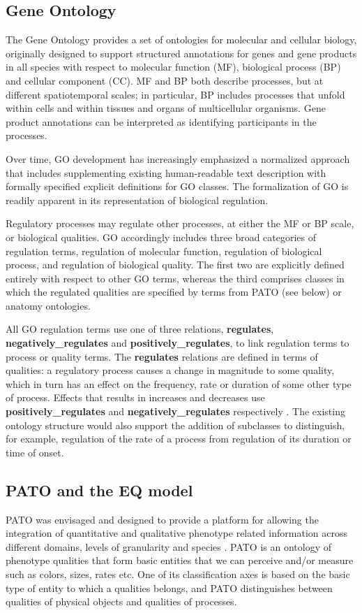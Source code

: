 \documentclass{bioinfo}
\renewcommand{\cite}{\citep}
\begin{document}
\begin{methods}
\subsection{Gene Ontology}
The Gene Ontology provides a set of ontologies for molecular and
cellular biology, originally designed to support structured
annotations for genes and gene products in all species with respect to
molecular function (MF), biological process (BP) and cellular
component (CC). MF and BP both describe processes, but at different
spatiotemporal scales; in particular, BP includes processes that
unfold within cells and within tissues and organs of multicellular
organisms. Gene product annotations can be interpreted as identifying
participants in the processes.

Over time, GO development has increasingly emphasized a normalized
approach that includes supplementing existing human-readable text
description with formally specified explicit definitions for GO
classes. The formalization of GO is readily apparent in its
representation of biological regulation.

Regulatory processes may regulate other processes, at either the MF or
BP scale, or biological qualities. GO accordingly includes three broad
categories of regulation terms, regulation of molecular function,
regulation of biological process, and regulation of biological
quality. The first two are explicitly defined entirely with respect to
other GO terms, whereas the third comprises classes in which the
regulated qualities are specified by terms from PATO (see below) or
anatomy ontologies.

All GO regulation terms use one of three relations, {\bf regulates},
{\bf negatively\_regulates} and {\bf positively\_regulates}, to link
regulation terms to process or quality terms. The {\bf regulates}
relations are defined in terms of qualities: a regulatory process
causes a change in magnitude to some quality, which in turn has an
effect on the frequency, rate or duration of some other type of
process. Effects that results in increases and decreases use {\bf
  positively\_regulates} and {\bf negatively\_regulates} respectively
\cite{Mungall2010go}. The existing ontology structure would also
support the addition of subclasses to distinguish, for example,
regulation of the rate of a process from regulation of its duration or
time of onset.

\subsection{PATO and the EQ model}
PATO was envisaged and designed to provide a platform for allowing the
integration of quantitative and qualitative phenotype related
information across different domains, levels of granularity and
species \cite{Gkoutos2005}.  PATO is an ontology of phenotype
qualities that form basic entities that we can perceive and/or measure
such as colors, sizes, rates etc. One of its classification axes is
based on the basic type of entity to which a qualities belongs, and
PATO distinguishes between qualities of physical objects and qualities
of processes.


\end{methods}
\end{document}
